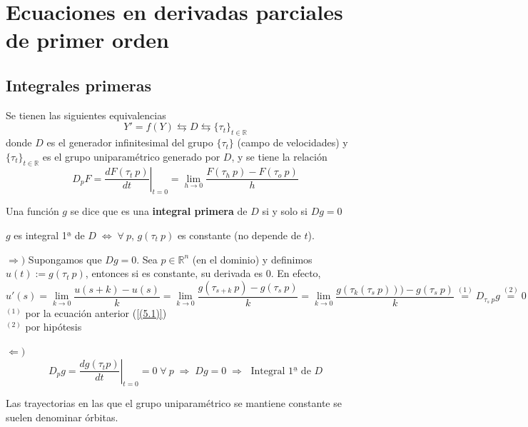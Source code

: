    \chapter{Ecuaciones en derivadas parciales de primer orden}
    \section{Integrales primeras}
    Se tienen las siguientes equivalencias
    $$Y'=f(Y) \leftrightarrows D \leftrightarrows \{\tau_t\}_{t \in \mathbb R}$$
    donde $D$ es el generador infinitesimal del grupo $\{\tau_t\}$ (campo de velocidades) y $ \{\tau_t\}_{t \in \mathbb R}$ es el grupo uniparamétrico generado por $D$, y se tiene la relación \\
    \begin{equation}
        D_pF=\left. \dfrac{dF(\tau_t \: p)}{dt} \right|_{t=0}=\lim_{h \to 0} \dfrac{F(\tau_h \: p)-F(\tau_o \: p)}{h} \label{(5.1)}
    \end{equation}
    \begin{defi}
        Una función $g$ se dice que es una \textbf{integral primera} de $D$ si y solo si $Dg=0$
    \end{defi}
    \begin{prop}
        $g$ es integral 1ª de $D \; \iff \; \forall \: p $, $g(\tau_t \: p)$ es constante (no depende de $t$).  
    \end{prop}
    \begin{dem} \: 
    
        $\Rightarrow)$ Supongamos que $Dg=0$. Sea $p\in \mathbb R^n$ (en el dominio) y definimos $u(t):=g(\tau_t \: p)$, entonces si es constante, su derivada es 0. En efecto,
        $$u'(s)=\lim_{k \to 0}\dfrac{u(s+k)-u(s)}{k}=\lim_{k \to 0} \dfrac{g(\tau_{s+k} \: p)-g(\tau_s \: p)}{k}=\lim_{k \to 0} \dfrac{g(\tau_k (\tau_s \: p)))-g(\tau_s \: p)}{k}\overset{(1)}{=}D_{\tau_s \: p} g\overset{(2)}{=}0$$
        $^{(1)}$ por la ecuación anterior (\ref{(5.1)}) \\
        $^{(2)}$ por hipótesis

        $\Leftarrow)$ 
        $$D_pg=\left.\dfrac{dg(\tau_t p )}{dt} \right|_{t=0}=0 \; \forall \: p \; \Rightarrow \; Dg=0 \; \Rightarrow \; \text{ Integral 1ª de } D$$
    \end{dem}
    \begin{obs}
        Las trayectorias en las que el grupo uniparamétrico se mantiene constante se suelen denominar órbitas.
    \end{obs}
